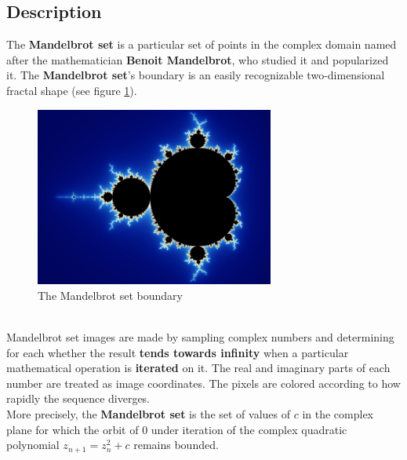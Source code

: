 \documentclass[a4paper,11pt]{article}
\begin{document}
\subsection{Description}
The \textbf{Mandelbrot set} is a particular set of points in the complex domain named after the mathematician
    \textbf{Benoit Mandelbrot}, who studied it and popularized it. The \textbf{Mandelbrot set}'s boundary is an easily
    recognizable two-dimensional fractal shape (see figure \ref{mandelbrot:boundary}).
\begin{figure}[h!]
\includegraphics[width=0.70\textwidth]{figures/mandelbrot_boundary.jpg}
\caption{The Mandelbrot set boundary}
\label{mandelbrot:boundary}
\end{figure}
\\
Mandelbrot set images are made by sampling complex numbers and determining for each whether the result
    \textbf{tends towards infinity} when a particular mathematical operation is \textbf{iterated} on it. The real
    and imaginary parts of each number are treated as image coordinates. The pixels are colored according to how rapidly
    the sequence diverges.
\\
More precisely, the \textbf{Mandelbrot set} is the set of values of $c$ in the complex plane for which the orbit of
    $0$ under iteration of the complex quadratic polynomial $z_{n+1} = z^2_n + c$ remains bounded.
\end{document}
